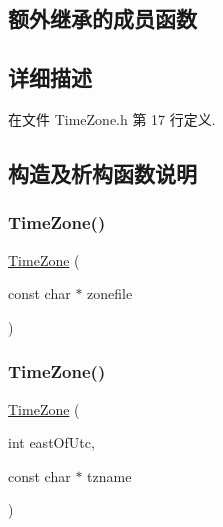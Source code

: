 \subsection*{额外继承的成员函数}


\subsection{详细描述}


在文件 Time\+Zone.\+h 第 17 行定义.



\subsection{构造及析构函数说明}
\mbox{\label{classmuduo_1_1TimeZone_a2b0e6c8c73f2852fd044cb59b6df77a8}} 
\subsubsection{\texorpdfstring{Time\+Zone()}{TimeZone()}\hspace{0.1cm}{\footnotesize\ttfamily [1/3]}}
{\footnotesize\ttfamily \hyperlink{classmuduo_1_1TimeZone}{Time\+Zone} (\begin{DoxyParamCaption}\item[{const char $\ast$}]{zonefile }\end{DoxyParamCaption})\hspace{0.3cm}{\ttfamily [explicit]}}

\mbox{\label{classmuduo_1_1TimeZone_aa462a0c14f5447827b6591048f9b15b5}} 
\subsubsection{\texorpdfstring{Time\+Zone()}{TimeZone()}\hspace{0.1cm}{\footnotesize\ttfamily [2/3]}}
{\footnotesize\ttfamily \hyperlink{classmuduo_1_1TimeZone}{Time\+Zone} (\begin{DoxyParamCaption}\item[{int}]{east\+Of\+Utc,  }\item[{const char $\ast$}]{tzname }\end{DoxyParamCaption})}

